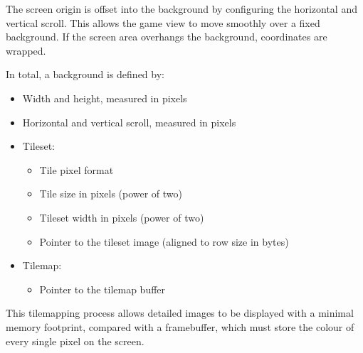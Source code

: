 The screen origin is offset into the background by configuring the horizontal and vertical scroll. This allows the game view to move smoothly over a fixed background. If the screen area overhangs the background, coordinates are wrapped.

In total, a background is defined by:

\begin{itemize}
	\item Width and height, measured in pixels
	\item Horizontal and vertical scroll, measured in pixels
	\item Tileset:
	\begin{itemize}
		\item Tile pixel format
		\item Tile size in pixels (power of two)
		\item Tileset width in pixels (power of two)
		\item Pointer to the tileset image (aligned to row size in bytes)
	\end{itemize}
	\item Tilemap:
	\begin{itemize}
		\item Pointer to the tilemap buffer
	\end{itemize}
\end{itemize}

This tilemapping process allows detailed images to be displayed with a minimal memory footprint, compared with a framebuffer, which must store the colour of every single pixel on the screen.